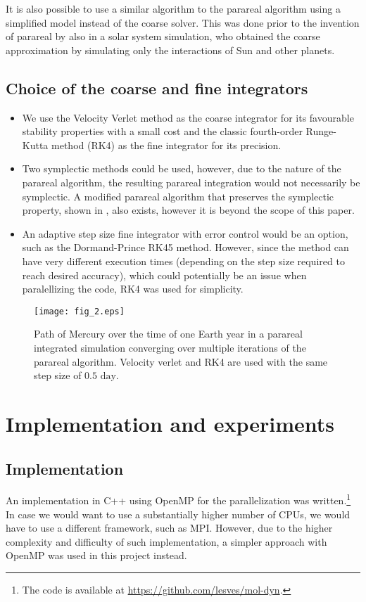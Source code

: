 \documentclass[conference]{IEEEtran}
\begin{document}
It is also possible to use a similar algorithm to the parareal algorithm using a simplified model instead of the coarse solver. This was done prior to the invention of parareal by \cite{parallelsolar} also in a solar system simulation, who obtained the coarse approximation by simulating only the interactions of Sun and other planets. \cite{parallelsolar} \cite{farfuture}

\subsection{Choice of the coarse and fine integrators}
\begin{itemize}
    \item We use the Velocity Verlet method as the coarse integrator for its favourable stability properties with a small cost and the classic fourth-order Runge-Kutta method (RK4) as the fine integrator for its precision. 
    \item Two symplectic methods could be used, however, due to the nature of the parareal algorithm, the resulting parareal integration would not necessarily be symplectic. A modified parareal algorithm that preserves the symplectic property, shown in \cite{symplecticparareal}, also exists, however it is beyond the scope of this paper.
    \item An adaptive step size fine integrator with error control would be an option, such as the Dormand-Prince RK45 method. However, since the method can have very different execution times (depending on the step size required to reach desired accuracy), which could potentially be an issue when paralellizing the code, RK4 was used for simplicity.
\end{itemize}

\begin{figure}[htbp]
\centerline{\texttt{[image: fig\_2.eps]}}
\caption{Path of Mercury over the time of one Earth year in a parareal integrated simulation converging over multiple iterations of the parareal algorithm. Velocity verlet and RK4 are used with the same step size of $0.5\text{ day}$.}
\label{mercury}
\end{figure}

\section{Implementation and experiments}

\subsection{Implementation}
An implementation in C++ using OpenMP for the parallelization was written.\footnote{The code is available at \url{https://github.com/lesves/mol-dyn}.} In case we would want to use a substantially higher number of CPUs, we would have to use a different framework, such as MPI. However, due to the higher complexity and difficulty of such  implementation, a simpler approach with OpenMP was used in this project instead.
\end{document}

